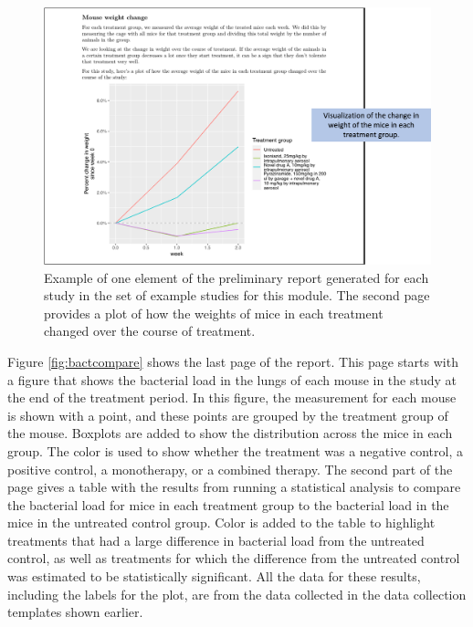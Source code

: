 \documentclass[]{tufte-book}
\begin{document}
\begin{figure}
\includegraphics[width=\textwidth]{figures/project_mouse_weights_graph} \caption[Example of one element of the preliminary report generated for each study in the set of example studies for this module]{Example of one element of the preliminary report generated for each study in the set of example studies for this module. The second page provides a plot of how the weights of mice in each treatment changed over the course of treatment.}\label{fig:mouseweightsplot}
\end{figure}

Figure \ref{fig:bactcompare} shows the last page of the report. This page
starts with a figure that shows the bacterial load in the lungs of each mouse in
the study at the end of the treatment period. In this figure, the measurement
for each mouse is shown with a point, and these points are grouped by the
treatment group of the mouse. Boxplots are added to show the distribution across
the mice in each group. The color is used to show whether the treatment was a
negative control, a positive control, a monotherapy, or a combined therapy. The
second part of the page gives a table with the results from running a
statistical analysis to compare the bacterial load for mice in each treatment
group to the bacterial load in the mice in the untreated control group. Color is
added to the table to highlight treatments that had a large difference in
bacterial load from the untreated control, as well as treatments for which the
difference from the untreated control was estimated to be statistically
significant. All the data for these results, including the labels for the plot,
are from the data collected in the data collection templates shown earlier.
\end{document}
